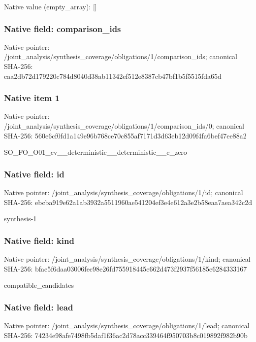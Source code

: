 \documentclass[10pt,a4paper]{article}
\begin{document}
Native value (empty\_\allowbreak{}array): []

\subsubsection{Native field: comparison\_\allowbreak{}ids}
Native pointer: /joint\_\allowbreak{}analysis/synthesis\_\allowbreak{}coverage/obligations/1/comparison\_\allowbreak{}ids; canonical SHA-256: caa2db72d179220c784d8040d38ab11342ef512e8387cb47bf1b5f5515fda65d

\subsubsection{Native item 1}
Native pointer: /joint\_\allowbreak{}analysis/synthesis\_\allowbreak{}coverage/obligations/1/comparison\_\allowbreak{}ids/0; canonical SHA-256: 560e6cf0fd1a149e96b768ce70c855af7171d3d63eb12d09f4fa6bef47ee88a2

\begingroup\raggedright\sloppy SO\_\allowbreak{}FO\_\allowbreak{}O01\_\allowbreak{}cv\_\allowbreak{}\_\allowbreak{}deterministic\_\allowbreak{}\_\allowbreak{}deterministic\_\allowbreak{}\_\allowbreak{}c\_\allowbreak{}zero\par\endgroup

\subsubsection{Native field: id}
Native pointer: /joint\_\allowbreak{}analysis/synthesis\_\allowbreak{}coverage/obligations/1/id; canonical SHA-256: ebcba919e62a1ab3932a5511960ae541204ef3e4e612a3e2b58eaa7aea342c2d

\begingroup\raggedright\sloppy synthesis-1\par\endgroup

\subsubsection{Native field: kind}
Native pointer: /joint\_\allowbreak{}analysis/synthesis\_\allowbreak{}coverage/obligations/1/kind; canonical SHA-256: bfae5f6daa03006fec98e26fd755918445e662d473f2937f56185e6284333167

\begingroup\raggedright\sloppy compatible\_\allowbreak{}candidates\par\endgroup

\subsubsection{Native field: lead}
Native pointer: /joint\_\allowbreak{}analysis/synthesis\_\allowbreak{}coverage/obligations/1/lead; canonical SHA-256: 74234e98afe7498fb5daf1f36ac2d78acc339464f950703b8c019892f982b90b
\end{document}
